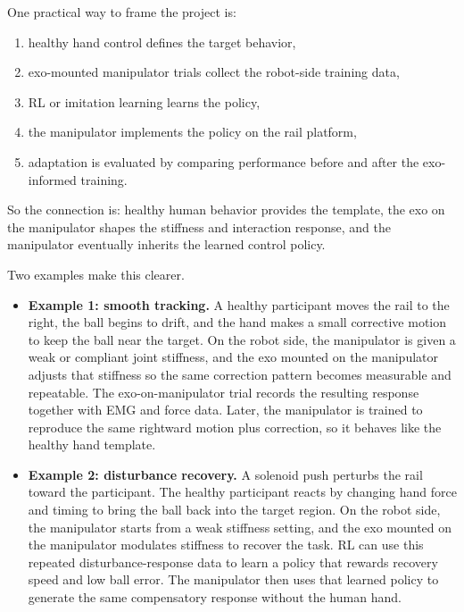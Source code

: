 \documentclass[11pt, a4paper]{article}
\begin{document}
One practical way to frame the project is:

\begin{enumerate}[nosep]
  \item healthy hand control defines the target behavior,
  \item exo-mounted manipulator trials collect the robot-side training data,
  \item RL or imitation learning learns the policy,
  \item the manipulator implements the policy on the rail platform,
  \item adaptation is evaluated by comparing performance before and after the exo-informed training.
\end{enumerate}

So the connection is: healthy human behavior provides the template, the exo on the manipulator shapes the stiffness and interaction response, and the manipulator eventually inherits the learned control policy.

Two examples make this clearer.

\begin{itemize}[nosep]
  \item \textbf{Example 1: smooth tracking.} A healthy participant moves the rail to the right, the ball begins to drift, and the hand makes a small corrective motion to keep the ball near the target. On the robot side, the manipulator is given a weak or compliant joint stiffness, and the exo mounted on the manipulator adjusts that stiffness so the same correction pattern becomes measurable and repeatable. The exo-on-manipulator trial records the resulting response together with EMG and force data. Later, the manipulator is trained to reproduce the same rightward motion plus correction, so it behaves like the healthy hand template.
  \item \textbf{Example 2: disturbance recovery.} A solenoid push perturbs the rail toward the participant. The healthy participant reacts by changing hand force and timing to bring the ball back into the target region. On the robot side, the manipulator starts from a weak stiffness setting, and the exo mounted on the manipulator modulates stiffness to recover the task. RL can use this repeated disturbance-response data to learn a policy that rewards recovery speed and low ball error. The manipulator then uses that learned policy to generate the same compensatory response without the human hand.
\end{itemize}
\end{document}
